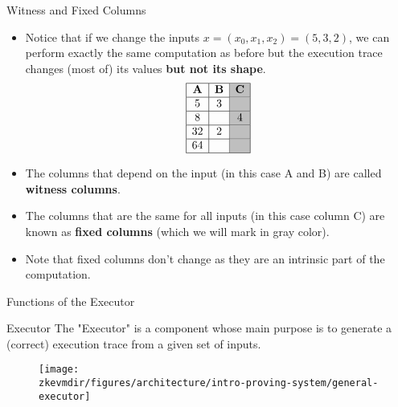 \begin{frame}{Witness and Fixed Columns}
\begin{itemize}
\item Notice that if we change the inputs $x=(x_0, x_1, x_2)=(5,3,2)$, we can perform exactly the same computation as before but the execution trace changes (most of) its values \textbf{but not its shape}.
$$
\begin{array}{|c|c|c|}
\hline
\textbf{A} & \textbf{B} & \cellcolor{lightgray} \textbf{C} \\ \hline
5 & 3 & \cellcolor{lightgray} \\ \hline
8 & & 4 \cellcolor{lightgray} \\ \hline
32 & 2 & \cellcolor{lightgray} \\ \hline
64 & & \cellcolor{lightgray} \\ \hline
\end{array}
$$

\item The columns that depend on the input (in this case A and B) are called \textbf{witness columns}.
\item The columns that are the same for all inputs (in this case column C) are known as \textbf{fixed columns} (which we will mark in gray color).
\item Note that fixed columns don't change as they are an intrinsic part of the computation.
\end{itemize}
\end{frame}






\begin{frame}{Functions of the Executor}

\begin{block}{Executor}
The "Executor" is a component whose main purpose is to generate a (correct) execution trace from a given set of inputs.
\end{block}

\begin{figure}
\texttt{[image: \\zkevmdir/figures/architecture/intro-proving-system/general-executor]}
\end{figure}
\end{frame}




